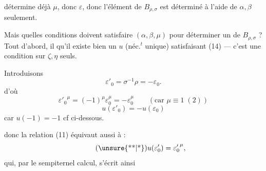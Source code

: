 détermine déjà $\mu$, donc $\varepsilon$, donc   l'élément de $B_{\rho,\sigma}$ est déterminé à l'aide de $\alpha,\beta$ seulement.

Mais quelles conditions doivent satisfaire $(\alpha,\beta,\mu)$ pour déterminer un  de $B_{\rho,\sigma}$ ? Tout d'abord, il  qu'il existe bien un  $u$ (néc.$^{t}$ unique) satisfaisant (14) — c'est une condition sur $\zeta,\eta$ seuls.


Introduisons
\[
\tag{*}
\varepsilon'_0=\sigma^{-1}\rho=-\varepsilon_0.
\]
d'où
\[
{\varepsilon'_0}^{\mu}=(-1)^\mu\varepsilon_0^\mu=-\varepsilon_0^\mu
\qquad(\text{car }\mu\equiv1\;(2))
\]
\[
u(\varepsilon'_0)=-u(\varepsilon_0)
\]
car $u(-1)=-1$ cf ci-dessous.

donc la relation (11) équivaut aussi à :
\[
\tag{\unsure{**|*}}
u(\varepsilon'_0)={\varepsilon'_0}^{\mu},
\]
qui, par le sempiternel calcul, s'écrit ainsi

